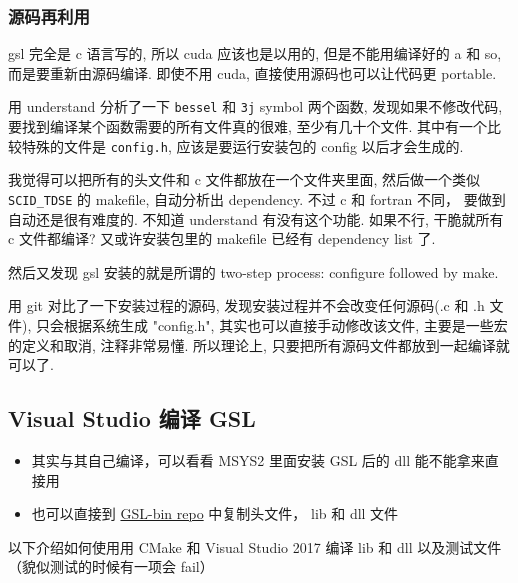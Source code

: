 \subsubsection{源码再利用}
gsl 完全是 c 语言写的, 所以 cuda 应该也是以用的, 但是不能用编译好的 a 和 so, 而是要重新由源码编译. 即使不用 cuda, 直接使用源码也可以让代码更 portable.

用 understand 分析了一下 \verb`bessel` 和 \verb`3j` symbol 两个函数, 发现如果不修改代码, 要找到编译某个函数需要的所有文件真的很难, 至少有几十个文件. 其中有一个比较特殊的文件是 \verb`config.h`, 应该是要运行安装包的 config 以后才会生成的.

我觉得可以把所有的头文件和 c 文件都放在一个文件夹里面, 然后做一个类似 \verb|SCID_TDSE| 的 makefile, 自动分析出 dependency. 不过 c 和 fortran 不同， 要做到自动还是很有难度的. 不知道 understand 有没有这个功能. 如果不行, 干脆就所有 c 文件都编译? 又或许安装包里的 makefile 已经有 dependency list 了.

然后又发现 gsl 安装的就是所谓的 two-step process: configure followed by make.

用 git 对比了一下安装过程的源码, 发现安装过程并不会改变任何源码(.c 和 .h 文件), 只会根据系统生成 "config.h", 其实也可以直接手动修改该文件, 主要是一些宏的定义和取消, 注释非常易懂. 所以理论上, 只要把所有源码文件都放到一起编译就可以了.


\subsection{Visual Studio 编译 GSL}
\begin{itemize}
\item 其实与其自己编译，可以看看 MSYS2 里面安装 GSL 后的 dll 能不能拿来直接用
\item 也可以直接到 \href{https://github.com/MacroUniverse/GSL-bin}{GSL-bin repo} 中复制头文件， lib 和 dll 文件
\end{itemize}

以下介绍如何使用用 CMake 和 Visual Studio 2017 编译 lib 和 dll 以及测试文件（貌似测试的时候有一项会 fail）

